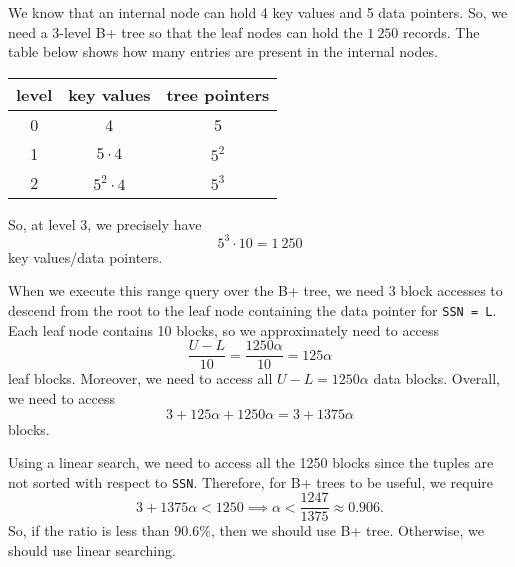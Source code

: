 \documentclass[a4paper, openany]{memoir}
\theoremstyle{definition}
\begin{document}
\begin{answer}
    We know that an internal node can hold 4 key values and 5 data pointers. So, we need a 3-level B+ tree so that the leaf nodes can hold the $1 \ 250$ records. The table below shows how many entries are present in the internal nodes.
    \begin{table}[H]
        \centering
        \begin{tabular}{|c|c|c|}
            \hline
            level & key values & tree pointers \\
            \hline
            0 & 4 & 5 \\
            1 & $5 \cdot 4$ & $5^2$ \\
            2 & $5^2 \cdot 4$ & $5^3$ \\
            \hline
        \end{tabular}
    \end{table}
    \noindent So, at level 3, we precisely have
    \[5^3 \cdot 10 = 1 \ 250\]
    key values/data pointers. 
    
    When we execute this range query over the B+ tree, we need 3 block accesses to descend from the root to the leaf node containing the data pointer for \texttt{SSN = L}. Each leaf node contains 10 blocks, so we approximately need to access 
    \[\frac{U - L}{10} = \frac{1250 \alpha}{10} = 125 \alpha\]
    leaf blocks. Moreover, we need to access all $U - L = 1250 \alpha$ data blocks. Overall, we need to access
    \[3 + 125 \alpha + 1250 \alpha = 3 + 1375 \alpha\]
    blocks. 
    
    Using a linear search, we need to access all the 1250 blocks since the tuples are not sorted with respect to \texttt{SSN}. Therefore, for B+ trees to be useful, we require 
    \[3 + 1375 \alpha < 1250 \implies \alpha < \frac{1247}{1375} \approx 0.906.\]
    So, if the ratio is less than $90.6\%$, then we should use B+ tree. Otherwise, we should use linear searching.
\end{answer}
\end{document}
